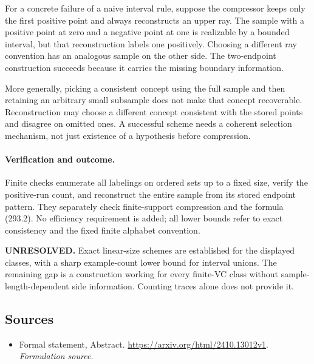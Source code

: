 \documentclass[11pt]{article}
\begin{document}
For a concrete failure of a naive interval rule, suppose the compressor keeps only the first positive point and always reconstructs an upper ray. The sample with a positive point at zero and a negative point at one is realizable by a bounded interval, but that reconstruction labels one positively. Choosing a different ray convention has an analogous sample on the other side. The two-endpoint construction succeeds because it carries the missing boundary information.

More generally, picking a consistent concept using the full sample and then retaining an arbitrary small subsample does not make that concept recoverable. Reconstruction may choose a different concept consistent with the stored points and disagree on omitted ones. A successful scheme needs a coherent selection mechanism, not just existence of a hypothesis before compression.

\paragraph{Verification and outcome.}
Finite checks enumerate all labelings on ordered sets up to a fixed size, verify the positive-run count, and reconstruct the entire sample from its stored endpoint pattern. They separately check finite-support compression and the formula (293.2). No efficiency requirement is added; all lower bounds refer to exact consistency and the fixed finite alphabet convention.

\textbf{UNRESOLVED.} Exact linear-size schemes are established for the displayed classes, with a sharp example-count lower bound for interval unions. The remaining gap is a construction working for every finite-VC class without sample-length-dependent side information. Counting traces alone does not provide it.

\subsection{Sources}
\begin{itemize}
\item[S1]Formal statement, Abstract.
\url{https://arxiv.org/html/2410.13012v1}.
\textit{Formulation source.}
\end{itemize}
\end{document}
